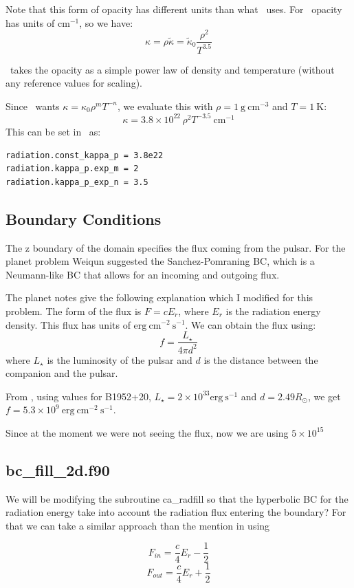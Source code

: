 \documentclass[11pt]{article}
\newcommand{\gcc}{\mathrm{g~cm^{-3} }}
\newcommand{\castro}{{\sffamily{Castro}}}
\begin{document}
Note that this form of opacity has different units than what \castro\ uses.  For \castro\,
opacity has units of $\mathrm{cm^{-1}}$, so we have:
\begin{equation}
  \kappa = \rho \tilde{\kappa} = \tilde{\kappa}_0 \frac{\rho^2}{T^{3.5}}
\end{equation}
 

\castro\ takes the opacity as a simple power law of density and temperature (without any reference values for scaling).

Since \castro\ wants $\kappa = \kappa_0 \rho^m T^{-n}$, we evaluate this with $\rho = 1~\gcc$ and $T = 1~\mathrm{K}$:
\begin{equation}
  \kappa = 3.8 \times 10^{22} \, \rho^2 T^{-3.5}~\mathrm{cm^{-1}}
\end{equation}
This can be set in \castro\ as:
\begin{verbatim}
radiation.const_kappa_p = 3.8e22
radiation.kappa_p.exp_m = 2
radiation.kappa_p_exp_n = 3.5
\end{verbatim}


\subsection{Boundary Conditions}

The z boundary of the domain specifies the flux coming from
the pulsar.  For the planet problem Weiqun suggested the Sanchez-Pomraning BC, which is a Neumann-like BC that allows for an incoming and outgoing flux.

The planet notes give the following explanation which I modified for this problem. The form of the flux is $F = cE_r$, where $E_r$ is the radiation energy density.  This flux has units of $\mathrm{erg~cm^{-2}~s^{-1}}$.
We can obtain the flux using:
\begin{equation}
  f = \frac{L_\star}{4\pi d^2}
\end{equation}
where $L_\star$ is the luminosity of the pulsar and $d$ is the
distance between the companion and the pulsar.


   From \cite{0004-637X-769-2-108}, using values for B1952+20,  $L_\star = 2\times 10^{33}\mathrm{erg~s^{-1}}$ and $d = 2.49R_\odot$,  we get $f =
5.3\times 10^9~\mathrm{erg~cm^{-2}~s^{-1}}$.

Since at the moment we were not seeing the flux, now we are using $5\times 10^15$ 

   \subsection{bc\_fill\_2d.f90}
   We will be modifying the subroutine ca\_radfill so that the hyperbolic BC for the radiation energy take into account the radiation flux entering the boundary? For that we can take a similar approach than the mention in \cite{advinrad} using 
   
   $$F_{in} = \frac{c}{4} E_r - \frac{1}{2}$$
   $$F_{out} = \frac{c}{4} E_r + \frac{1}{2}$$
   


{}

\end{document}
